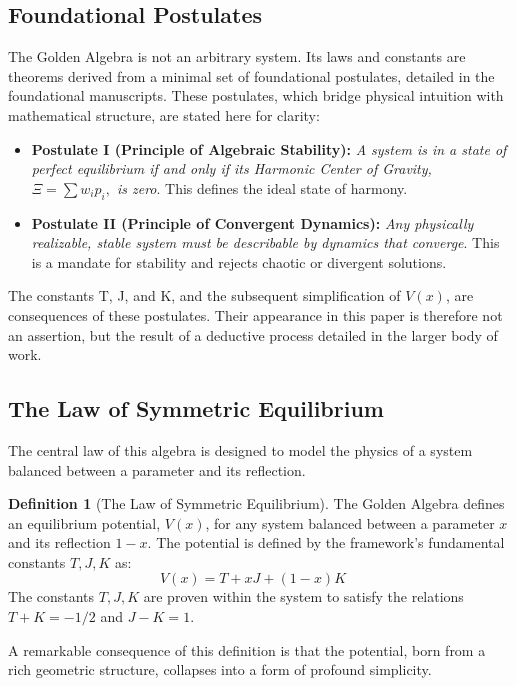 \documentclass{article}
\theoremstyle{plain}
\theoremstyle{definition}
\newtheorem{definition}[theorem]{Definition}
\theoremstyle{remark}
\begin{document}
\subsection{Foundational Postulates}

The Golden Algebra is not an arbitrary system. Its laws and constants are theorems derived from a minimal set of foundational postulates, detailed in the foundational manuscripts. These postulates, which bridge physical intuition with mathematical structure, are stated here for clarity:

\begin{itemize}
    \item \textbf{Postulate I (Principle of Algebraic Stability):} \textit{A system is in a state of perfect equilibrium if and only if its Harmonic Center of Gravity, $\Xi=\sum w_{i}p_{i},$ is zero}. This defines the ideal state of harmony.
    \item \textbf{Postulate II (Principle of Convergent Dynamics):} \textit{Any physically realizable, stable system must be describable by dynamics that converge}. This is a mandate for stability and rejects chaotic or divergent solutions.
\end{itemize}

The constants T, J, and K, and the subsequent simplification of $V(x)$, are consequences of these postulates. Their appearance in this paper is therefore not an assertion, but the result of a deductive process detailed in the larger body of work.

\subsection{The Law of Symmetric Equilibrium}

The central law of this algebra is designed to model the physics of a system balanced between a parameter and its reflection.

\begin{definition}[The Law of Symmetric Equilibrium]
The Golden Algebra defines an equilibrium potential, $V(x)$, for any system balanced between a parameter $x$ and its reflection $1-x$. The potential is defined by the framework's fundamental constants $T, J, K$ as:
$$V(x) = T + xJ + (1-x)K \quad \text{}$$
The constants $T, J, K$ are proven within the system to satisfy the relations $T+K = -1/2$ and $J-K=1$.
\end{definition}

A remarkable consequence of this definition is that the potential, born from a rich geometric structure, collapses into a form of profound simplicity.
\end{document}
